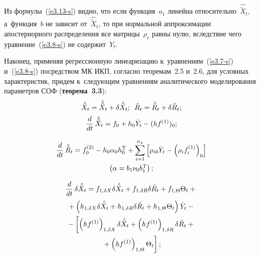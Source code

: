\begin{multicols}{2}
Из формулы~(\ref{e3.13-s}) видно, что если функция~$a_1$ линейна
относительно~$\hat{\tilde X}_t$, а~функция~$b$ не зависит от~$\hat{\tilde  X}_t$, то при
нормальной аппроксимации апостериорного распределения все матрицы~$\rho_r$ равны нулю, вследствие чего уравнение~(\ref{e3.8-s}) не содержит~$\dot Y_t$.

Наконец, применяя регрессионную линеаризацию к~уравнениям~(\ref{e3.7-s}) и~(\ref{e3.8-s}) 
посредством  МК ИКП, согласно теоремам~2.5 и~2.6, для условных характеристик, 
придем к~следующим уравнениям аналитического моделирования параметров СОФ (\textbf{теорема~3.3}):
\begin{equation*}
\hat{\tilde X}_t = \hat{\tilde{\tilde X}}_t + \delta \hat{\tilde 
X}_t;\enskip \tilde R_t = \tilde{\tilde R}_t + \delta \tilde R_t; %
\end{equation*}
\begin{equation}
\displaystyle\frac{\displaystyle d\mathstrut}{\displaystyle dt\mathstrut}\,\hat{\tilde{\tilde X}}_t = f_0 + h_0 \dot Y_t -(hf^{(1)})_0;
\label{e3.16-s}
\end{equation}

\vspace*{-12pt}

\noindent
\begin{multline}
\displaystyle\frac{\displaystyle d\mathstrut}{\displaystyle dt\mathstrut}\, \tilde{\tilde R}_t = f_0^{(2)} - h_0 \alpha_0 h_0^{\mathrm{T}} + 
\sum\limits_{i=1}^{n_y} \left[ \rho_{i0} \dot Y_t - \left(\rho_i f_i^{(1)}\right)_0\right] \\
 \left(\alpha= 
b_1\nu_0 b_1^{\mathrm{T}}\right);
\label{e3.17-s}
\end{multline}

\vspace*{-12pt}

\noindent
\begin{multline}
\displaystyle\frac{\displaystyle d\mathstrut}{\displaystyle dt\mathstrut}\, \delta \hat{\tilde X}_t = f_{1,\delta X} \delta \hat{\tilde 
X}_t + f_{1,\delta R} \delta \tilde R_t + f_{1,\Theta} \Theta_t 
+{}\\
{}+\left(h_{1,\delta X} \delta \hat{\tilde X}_t + h_{1,\delta R} \delta \tilde R_t 
+ h_{1,\Theta} \Theta_t\right) \dot Y_t -{}\\
{}-\left[ \left( hf^{(1)}\right)_{1,\delta X} \delta \hat{\tilde X}_t +\left( 
hf^{(1)}\right)_{1,\delta R} \delta \tilde R_t +{}\right.\\
\left.{}+\left( 
hf^{(1)}\right)_{1,\Theta} \Theta_t\right];
\label{e3.18-s}
\end{multline}

\vspace*{-12pt}


\end{multicols}

